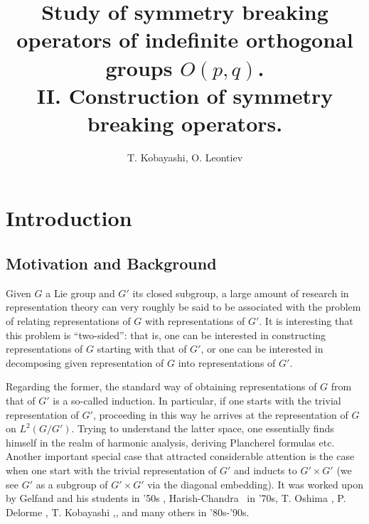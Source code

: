 \documentclass{article}
\numberwithin{definition}{section}
\numberwithin{lemma}{section}
\numberwithin{proposition}{section}
{\theorembodyfont{\rmfamily}\newtheorem{remark}{Remark}
\numberwithin{remark}{section}
}
\begin{document}
\title{Study of symmetry breaking operators of indefinite orthogonal groups $O( p, q)$.\\ 
II. Construction of symmetry breaking operators.}
\author{T. Kobayashi, O. Leontiev}
\maketitle

{\tableofcontents}

\setcounter{section}{8}
\section{Introduction}

\subsection{Motivation and Background}

Given $G$ a Lie group and $G'$ its closed subgroup, a large amount of research
in representation theory can very roughly be said to be associated with the
problem of relating representations of $G$ with representations of $G'$. It is
interesting that this problem is ``two-sided'': that is, one can be interested
in constructing representations of $G$ starting with that of $G'$, or one can
be interested in decomposing given representation of $G$ into representations
of $G'$.

Regarding the former, the standard way of obtaining representations of $G$
from that of $G'$ is a so-called induction. In particular, if one starts with
the trivial representation of $G'$, proceeding in this way he arrives at the
representation of $G$ on $L^2 ( G / G')$. Trying to understand the latter
space, one essentially finds himself in the realm of harmonic analysis,
deriving Plancherel formulas etc. Another important special case that
attracted considerable attention is the case when one start with the trivial
representation of $G'$ and inducts to $G' \times G'$ (we see $G'$ as a
subgroup of $G' \times G'$ via the diagonal embedding). It was worked upon by
Gelfand and his students {\cite{gelfand1966generalized}} in '50s ,
Harish-Chandra {\cite{harishchandra1978harmonic}} \ in '70s, T. Oshima
{\cite{oshima1984description}}, P. Delorme {\cite{delorme1998plancherel}}, T.
Kobayashi
{\cite{kobayashi1994discrete1}},{\cite{kobayashi1998discrete2}},{\cite{kobayashi1998discrete3}}
and many others in '80s-'90s.
\end{document}
